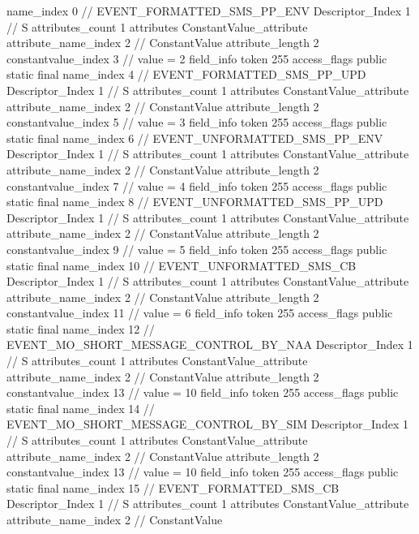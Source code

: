 {{{{{				name_index	0		// EVENT_FORMATTED_SMS_PP_ENV
				Descriptor_Index	1		// S
				attributes_count	1
				attributes {
				ConstantValue_attribute {
					attribute_name_index	2		// ConstantValue
					attribute_length	2
					constantvalue_index	3		// value = 2
				}
				}
			}
			field_info {
				token	255
				access_flags	public static final
				name_index	4		// EVENT_FORMATTED_SMS_PP_UPD
				Descriptor_Index	1		// S
				attributes_count	1
				attributes {
				ConstantValue_attribute {
					attribute_name_index	2		// ConstantValue
					attribute_length	2
					constantvalue_index	5		// value = 3
				}
				}
			}
			field_info {
				token	255
				access_flags	public static final
				name_index	6		// EVENT_UNFORMATTED_SMS_PP_ENV
				Descriptor_Index	1		// S
				attributes_count	1
				attributes {
				ConstantValue_attribute {
					attribute_name_index	2		// ConstantValue
					attribute_length	2
					constantvalue_index	7		// value = 4
				}
				}
			}
			field_info {
				token	255
				access_flags	public static final
				name_index	8		// EVENT_UNFORMATTED_SMS_PP_UPD
				Descriptor_Index	1		// S
				attributes_count	1
				attributes {
				ConstantValue_attribute {
					attribute_name_index	2		// ConstantValue
					attribute_length	2
					constantvalue_index	9		// value = 5
				}
				}
			}
			field_info {
				token	255
				access_flags	public static final
				name_index	10		// EVENT_UNFORMATTED_SMS_CB
				Descriptor_Index	1		// S
				attributes_count	1
				attributes {
				ConstantValue_attribute {
					attribute_name_index	2		// ConstantValue
					attribute_length	2
					constantvalue_index	11		// value = 6
				}
				}
			}
			field_info {
				token	255
				access_flags	public static final
				name_index	12		// EVENT_MO_SHORT_MESSAGE_CONTROL_BY_NAA
				Descriptor_Index	1		// S
				attributes_count	1
				attributes {
				ConstantValue_attribute {
					attribute_name_index	2		// ConstantValue
					attribute_length	2
					constantvalue_index	13		// value = 10
				}
				}
			}
			field_info {
				token	255
				access_flags	public static final
				name_index	14		// EVENT_MO_SHORT_MESSAGE_CONTROL_BY_SIM
				Descriptor_Index	1		// S
				attributes_count	1
				attributes {
				ConstantValue_attribute {
					attribute_name_index	2		// ConstantValue
					attribute_length	2
					constantvalue_index	13		// value = 10
				}
				}
			}
			field_info {
				token	255
				access_flags	public static final
				name_index	15		// EVENT_FORMATTED_SMS_CB
				Descriptor_Index	1		// S
				attributes_count	1
				attributes {
				ConstantValue_attribute {
					attribute_name_index	2		// ConstantValue
}}}}}}}

